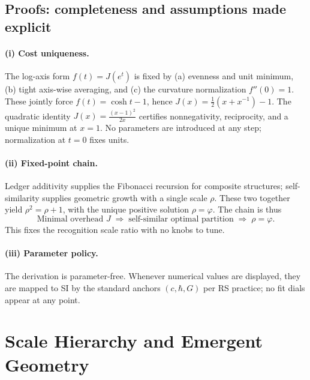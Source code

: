 \documentclass[11pt]{article}
\theoremstyle{definition}
\theoremstyle{remark}
\begin{document}
\subsection*{Proofs: completeness and assumptions made explicit}
\paragraph{(i) Cost uniqueness.}
The log-axis form \(f(t)=J(e^t)\) is fixed by (a) evenness and unit minimum, (b) tight axis-wise averaging, and (c) the curvature normalization \(f''(0)=1\). These jointly force \(f(t)=\cosh t-1\), hence \(J(x)=\frac12(x+x^{-1})-1\). The quadratic identity \(J(x)=\frac{(x-1)^2}{2x}\) certifies nonnegativity, reciprocity, and a unique minimum at \(x=1\). No parameters are introduced at any step; normalization at \(t=0\) fixes units. %

\paragraph{(ii) Fixed-point chain.}
Ledger additivity supplies the Fibonacci recursion for composite structures; self-similarity supplies geometric growth with a single scale \(\rho\). These two together yield \(\rho^2=\rho+1\), with the unique positive solution \(\rho=\varphi\). The chain is thus
\[
  \text{Minimal overhead } J\;\Longrightarrow\;\text{self-similar optimal partition}\;\Longrightarrow\;\rho=\varphi.
\]
This fixes the recognition scale ratio with no knobs to tune. %

\paragraph{(iii) Parameter policy.}
The derivation is parameter-free. Whenever numerical values are displayed, they are mapped to SI by the standard anchors \((c,\hbar,G)\) per RS practice; no fit dials appear at any point. %

\section{Scale Hierarchy and Emergent Geometry}
\end{document}
